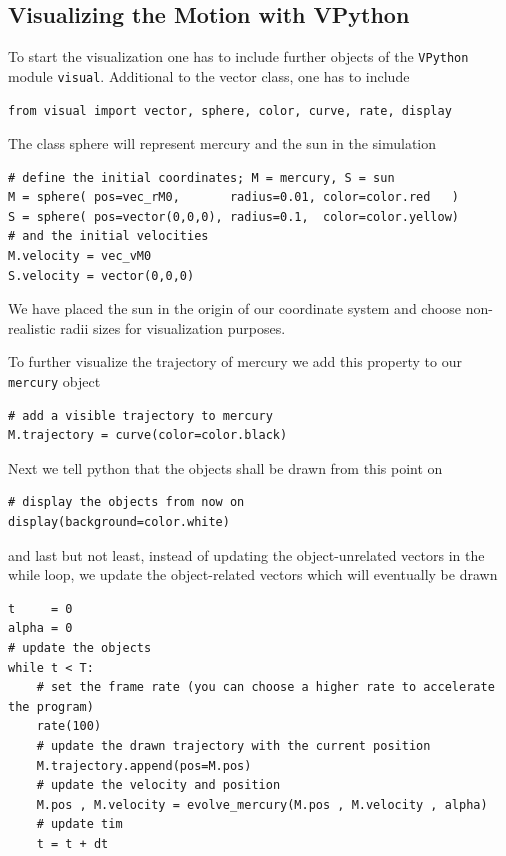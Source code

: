 \documentclass[12pt]{iopart}
\begin{document}
\subsection{Visualizing the Motion with VPython}
To start the visualization one has to include further objects of the \texttt{VPython} module \texttt{visual}.
Additional to the vector class, one has to include
\begin{lstlisting}
from visual import vector, sphere, color, curve, rate, display
\end{lstlisting}
The class sphere will represent mercury and the sun in the simulation 
\begin{lstlisting}
# define the initial coordinates; M = mercury, S = sun
M = sphere( pos=vec_rM0,       radius=0.01, color=color.red   )
S = sphere( pos=vector(0,0,0), radius=0.1,  color=color.yellow)
# and the initial velocities
M.velocity = vec_vM0
S.velocity = vector(0,0,0)
\end{lstlisting}
We have placed the sun in the origin of our coordinate system and choose non-realistic radii sizes for visualization purposes.

To further visualize the trajectory of mercury we add this property to our \texttt{mercury} object
\begin{lstlisting}
# add a visible trajectory to mercury
M.trajectory = curve(color=color.black)
\end{lstlisting}
Next we tell python that the objects shall be drawn from this point on 
\begin{lstlisting}
# display the objects from now on
display(background=color.white)
\end{lstlisting}
and last but not least, instead of updating the object-unrelated vectors in the while loop, we update the object-related vectors which will eventually be drawn 
\begin{lstlisting}
t     = 0
alpha = 0
# update the objects
while t < T:
	# set the frame rate (you can choose a higher rate to accelerate the program)
	rate(100)
	# update the drawn trajectory with the current position
	M.trajectory.append(pos=M.pos)
	# update the velocity and position
	M.pos , M.velocity = evolve_mercury(M.pos , M.velocity , alpha)
	# update tim
	t = t + dt
\end{lstlisting}
\end{document}
